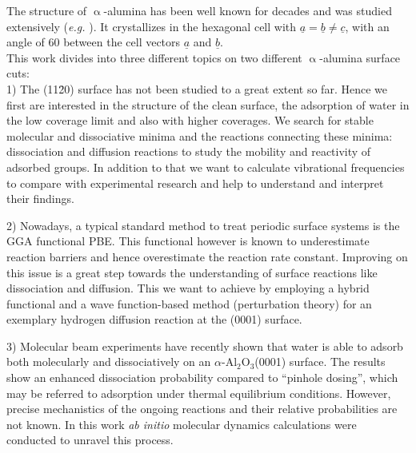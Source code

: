 \documentclass[11pt,DIV=13,BCOR=5mm,a4paper,headinclude]{scrbook}
\renewcommand{\vec}[1]{\underline{#1}}
\begin{document}
The structure of $\upalpha$-alumina has been well known for decades and was studied extensively (\textit{e.g.} \cite{Passerini1930,wyckoff1931}).
It crystallizes in the hexagonal cell with $\vec{a}=\vec{b}\neq \vec{c}$, with an angle of $60$\textdegree{} between the cell vectors $\vec{a}$ and $\vec{b}$.
\\

This work divides into three different topics on two different $\upalpha$-alumina surface cuts:\\
1) The (11\=20) surface has not been studied to a great extent so far.
Hence we first are interested in the structure of the clean surface, the adsorption of water in the low coverage limit and also with higher coverages.
We search for stable molecular and dissociative minima and the reactions connecting these minima: dissociation and diffusion reactions to study the mobility and reactivity of adsorbed groups.
In addition to that we want to calculate vibrational frequencies to compare with experimental research and help to understand and interpret their findings.


2) Nowadays, a typical standard method to treat periodic surface systems is the GGA functional PBE.
This functional however is known to underestimate reaction barriers and hence overestimate the reaction rate constant.
Improving on this issue is a great step towards the understanding of surface reactions like dissociation and diffusion.
This we want to achieve by employing a hybrid functional and a wave function-based method (perturbation theory) for an exemplary hydrogen diffusion reaction at the (0001) surface.


3) Molecular beam experiments have recently shown that water is able to adsorb both molecularly and dissociatively on an $\alpha$-Al$_{\text{2}}$O$_{\text{3}}$(0001) surface\cite{Wirth2014}.
The results show an enhanced dissociation probability compared to ``pinhole dosing'', which may be referred to adsorption under thermal equilibrium conditions.
However, precise mechanistics of the ongoing reactions  and their relative probabilities are not known.
In this work \textit{ab initio} molecular dynamics calculations were conducted to unravel this process.
\end{document}
